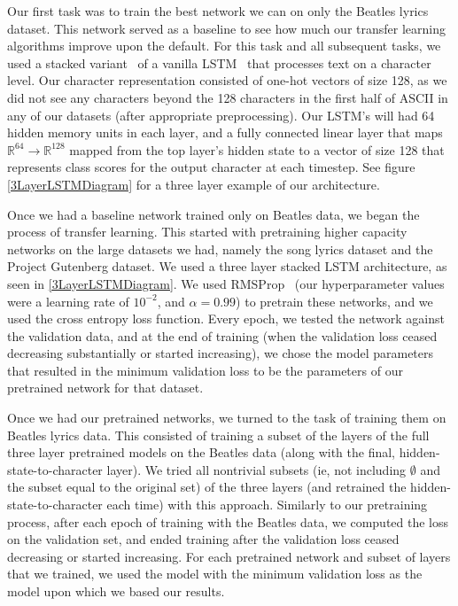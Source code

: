 \documentclass[10pt,twocolumn,letterpaper]{article}
\begin{document}
	Our first task was to train the best network we can on only the Beatles lyrics dataset. This network served as a baseline to see how much our transfer learning algorithms improve upon the default. For this task and all subsequent tasks, we used a stacked variant~\cite{graves2013generating} of a vanilla LSTM~\cite{LSTMArchitecturesSurvey} that processes text on a character level. Our character representation consisted of one-hot vectors of size 128, as we did not see any characters beyond the 128 characters in the first half of ASCII in any of our datasets (after appropriate preprocessing). Our LSTM's will had 64 hidden memory units in each layer, and a fully connected linear layer that maps $\mathbb{R}^{64}\to\mathbb{R}^{128}$ mapped from the top layer's hidden state to a vector of size 128 that represents class scores for the output character at each timestep. See figure \figurename{\ref{3LayerLSTMDiagram}} for a three layer example of our architecture.
	
	Once we had a baseline network trained only on Beatles data, we began the process of transfer learning. This started with pretraining higher capacity networks on the large datasets we had, namely the song lyrics dataset and the Project Gutenberg dataset. We used a three layer stacked LSTM architecture, as seen in \figurename{\ref{3LayerLSTMDiagram}}. We used RMSProp~\cite{RMSProp} (our hyperparameter values were a learning rate of $10^{-2}$, and $\alpha=0.99$) to pretrain these networks, and we used the cross entropy loss function. Every epoch, we tested the network against the validation data, and at the end of training (when the validation loss ceased decreasing substantially or started increasing), we chose the model parameters that resulted in the minimum validation loss to be the parameters of our pretrained network for that dataset.
	
	Once we had our pretrained networks, we turned to the task of training them on Beatles lyrics data. This consisted of training a subset of the layers of the full three layer pretrained models on the Beatles data (along with the final, hidden-state-to-character layer). We tried all nontrivial subsets (ie, not including $\emptyset$ and the subset equal to the original set) of the three layers (and retrained the hidden-state-to-character each time) with this approach. Similarly to our pretraining process, after each epoch of training with the Beatles data, we computed the loss on the validation set, and ended training after the validation loss ceased decreasing or started increasing. For each pretrained network and subset of layers that we trained, we used the model with the minimum validation loss as the model upon which we based our results.
	
\end{document}
